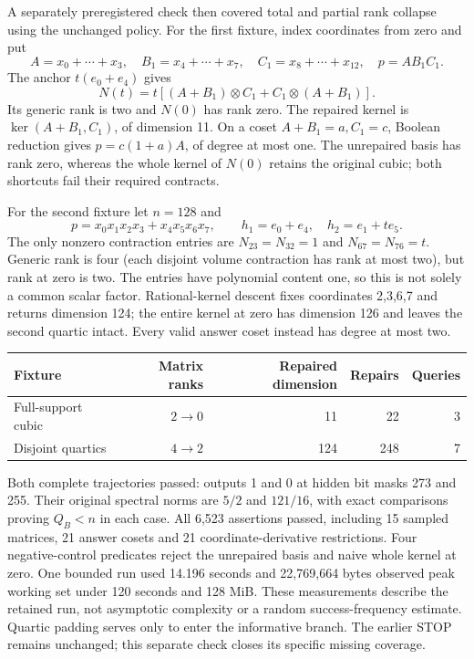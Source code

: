 \documentclass[11pt]{article}
\theoremstyle{remark}\newtheorem{remark}[theorem]{Remark}
\begin{document}
A separately preregistered check then covered total and partial rank collapse using the unchanged policy. For the first fixture, index coordinates from zero and put
\[
 A=x_0+\cdots+x_3,\quad B_1=x_4+\cdots+x_7,\quad
 C_1=x_8+\cdots+x_{12},\quad p=AB_1C_1.
\]
The anchor $t(e_0+e_4)$ gives
\[
 N(t)=t[(A+B_1)\otimes C_1+C_1\otimes(A+B_1)].
\]
Its generic rank is two and $N(0)$ has rank zero. The repaired kernel is $\ker(A+B_1,C_1)$, of dimension 11. On a coset $A+B_1=a,C_1=c$, Boolean reduction gives $p=c(1+a)A$, of degree at most one. The unrepaired basis has rank zero, whereas the whole kernel of $N(0)$ retains the original cubic; both shortcuts fail their required contracts.

For the second fixture let $n=128$ and
\[
 p=x_0x_1x_2x_3+x_4x_5x_6x_7,\qquad
 h_1=e_0+e_4,\quad h_2=e_1+te_5.
\]
The only nonzero contraction entries are $N_{23}=N_{32}=1$ and $N_{67}=N_{76}=t$. Generic rank is four (each disjoint volume contraction has rank at most two), but rank at zero is two. The entries have polynomial content one, so this is not solely a common scalar factor. Rational-kernel descent fixes coordinates 2,3,6,7 and returns dimension 124; the entire kernel at zero has dimension 126 and leaves the second quartic intact. Every valid answer coset instead has degree at most two.

\begin{center}
\begin{tabular}{lrrrr}
\hline
Fixture & Matrix ranks & Repaired dimension & Repairs & Queries\\
\hline
Full-support cubic & $2\to0$ & 11 & 22 & 3\\
Disjoint quartics & $4\to2$ & 124 & 248 & 7\\
\hline
\end{tabular}
\end{center}
Both complete trajectories passed: outputs 1 and 0 at hidden bit masks 273 and 255. Their original spectral norms are $5/2$ and $121/16$, with exact comparisons proving $Q_B<n$ in each case. All 6,523 assertions passed, including 15 sampled matrices, 21 answer cosets and 21 coordinate-derivative restrictions. Four negative-control predicates reject the unrepaired basis and naive whole kernel at zero. One bounded run used 14.196 seconds and 22,769,664 bytes observed peak working set under 120 seconds and 128 MiB. These measurements describe the retained run, not asymptotic complexity or a random success-frequency estimate. Quartic padding serves only to enter the informative branch. The earlier STOP remains unchanged; this separate check closes its specific missing coverage.
\end{document}
